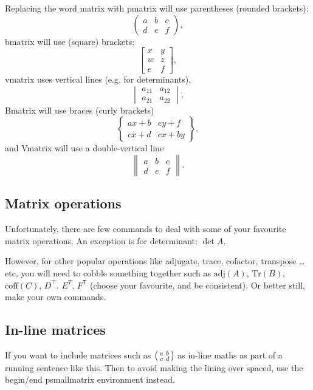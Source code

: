 \documentclass[a4paper,11pt]{article}
\begin{document}
Replacing the word matrix with pmatrix will use parentheses (rounded brackets):
\[ 
\begin{pmatrix}
 	a & b & c \\ 
 	d & e & f
\end{pmatrix},
\]
bmatrix will use (square) brackets: 
\[ 
\begin{bmatrix}
 	x & y\\ 
 	w & z \\
 	e & f
\end{bmatrix},
\]
vmatrix uses vertical lines (e.g. for determinants), 
\[
\begin{vmatrix}
 	a_{11} & a_{12} \\ 
 	a_{21} & a_{22}
\end{vmatrix},
\]
Bmatrix will use braces (curly brackets) 
\[
\begin{Bmatrix}
 	ax+b & ey+f\\ 
 	cx+d & cx+by
\end{Bmatrix},
\]
and Vmatrix will use a double-vertical line
\[
\begin{Vmatrix}
 	a & b & c \\ 
 	d & e & f
\end{Vmatrix}.
\]

\subsection{Matrix operations}

Unfortunately, there are few commands to deal with some of your favourite matrix operations. An exception is for determinant: $\det A$. 

However, for other popular operations like adjugate, trace, cofactor, transpose \dots etc, you will need to cobble something together such as $\mathrm{adj}(A)$, $\mathrm{Tr}(B)$, $\mathrm{coff}(C)$,  $D^\top$. $E^T$, $F^\mathsf{T}$ (choose your favourite, and be consistent). Or better still, make your own commands.
 
\subsection{In-line matrices}

If you want to include matrices such as 
$\begin{psmallmatrix}  %
 	a & b \\ 
 	c & d
\end{psmallmatrix}$
as in-line maths as part of a running sentence like this. Then to avoid making the lining over spaced, use the begin/end psmallmatrix environment instead. 
\end{document}
